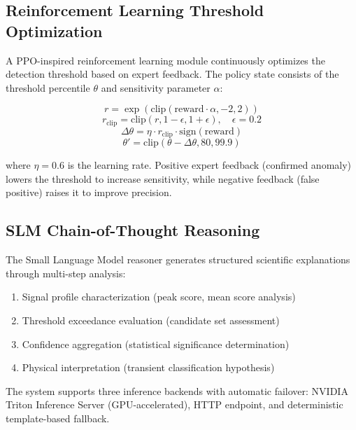 \documentclass[conference]{IEEEtran}
\begin{document}
\subsection{Reinforcement Learning Threshold Optimization}

A PPO-inspired reinforcement learning module continuously optimizes the detection threshold based on expert feedback. The policy state consists of the threshold percentile $\theta$ and sensitivity parameter $\alpha$:

\begin{equation}
r = \exp(\text{clip}(\text{reward} \cdot \alpha, -2, 2))
\end{equation}
\begin{equation}
r_{\text{clip}} = \text{clip}(r, 1-\epsilon, 1+\epsilon), \quad \epsilon = 0.2
\end{equation}
\begin{equation}
\Delta\theta = \eta \cdot r_{\text{clip}} \cdot \text{sign}(\text{reward})
\end{equation}
\begin{equation}
\theta' = \text{clip}(\theta - \Delta\theta, 80, 99.9)
\end{equation}

where $\eta = 0.6$ is the learning rate. Positive expert feedback (confirmed anomaly) lowers the threshold to increase sensitivity, while negative feedback (false positive) raises it to improve precision.

\subsection{SLM Chain-of-Thought Reasoning}

The Small Language Model reasoner generates structured scientific explanations through multi-step analysis:

\begin{enumerate}
    \item Signal profile characterization (peak score, mean score analysis)
    \item Threshold exceedance evaluation (candidate set assessment)
    \item Confidence aggregation (statistical significance determination)
    \item Physical interpretation (transient classification hypothesis)
\end{enumerate}

The system supports three inference backends with automatic failover: NVIDIA Triton Inference Server (GPU-accelerated), HTTP endpoint, and deterministic template-based fallback.
\end{document}
